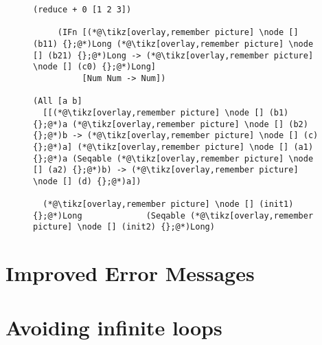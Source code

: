 \documentclass[9pt]{extarticle}
\begin{document}
\begin{figure}
\begin{lstlisting}
(reduce + 0 [1 2 3])

     (IFn [(*@\tikz[overlay,remember picture] \node [] (b11) {};@*)Long (*@\tikz[overlay,remember picture] \node [] (b21) {};@*)Long -> (*@\tikz[overlay,remember picture] \node [] (c0) {};@*)Long]
          [Num Num -> Num])

(All [a b]
  [[(*@\tikz[overlay,remember picture] \node [] (b1) {};@*)a (*@\tikz[overlay,remember picture] \node [] (b2) {};@*)b -> (*@\tikz[overlay,remember picture] \node [] (c) {};@*)a] (*@\tikz[overlay,remember picture] \node [] (a1) {};@*)a (Seqable (*@\tikz[overlay,remember picture] \node [] (a2) {};@*)b) -> (*@\tikz[overlay,remember picture] \node [] (d) {};@*)a])

  (*@\tikz[overlay,remember picture] \node [] (init1) {};@*)Long             (Seqable (*@\tikz[overlay,remember picture] \node [] (init2) {};@*)Long)

\end{lstlisting}
\end{figure}

\section{Improved Error Messages}

\section{Avoiding infinite loops}

\end{document}
